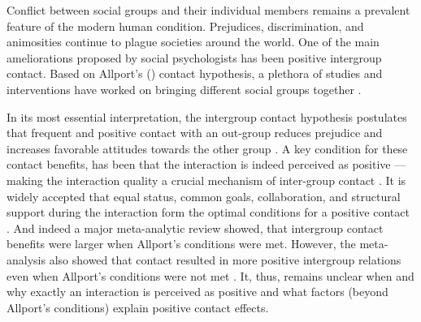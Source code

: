 \documentclass[man, 12pt, a4paper]{apa7}
\theoremstyle{break}
\theoremstyle{plain}
\begin{document}
%
%
%

Conflict between social groups and their individual members remains a prevalent feature of the modern human condition. Prejudices, discrimination, and animosities continue to plague societies around the world. One of the main ameliorations proposed by social psychologists has been positive intergroup contact. Based on Allport's (\citeyear{Allport1954b}) contact hypothesis, a plethora of studies and interventions have worked on bringing different social groups together \citep[e.g.,][]{AlRamiah2012a, Reimer2021}. 

In its most essential interpretation, the intergroup contact hypothesis postulates that frequent and positive contact with an out-group reduces prejudice and increases favorable attitudes towards the other group \citep[e.g.,][]{Hewstone1996, Pettigrew1998}. A key condition for these contact benefits, has been that the interaction is indeed perceived as positive --- making the interaction quality a crucial mechanism of inter-group contact \citep[e.g.,][]{MacInnis2015}. It is widely accepted that equal status, common goals, collaboration, and structural support during the interaction form the optimal conditions for a positive contact \citep[Allport's Optimal Contact conditions,][]{Allport1954b, Pettigrew1969}. And indeed a major meta-analytic review showed, that intergroup contact benefits were larger when Allport's conditions were met. However, the meta-analysis also showed that contact resulted in more positive intergroup relations even when Allport's conditions were not met \citep[][]{Pettigrew2006}. It, thus, remains unclear when and why exactly an interaction is perceived as positive and what factors (beyond Allport's conditions) explain positive contact effects.
\end{document}

